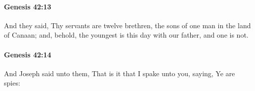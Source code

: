 		\paragraph{Genesis 42:13} %
			\label{GENESIS-42-13}

			And they said, Thy servants are twelve brethren, the sons of one man in the land of Canaan; and, behold, the youngest is this day with our father, and one is not.


		\paragraph{Genesis 42:14} %
			\label{GENESIS-42-14}

			And Joseph said unto them, That is it that I spake unto you, saying, Ye are spies:


